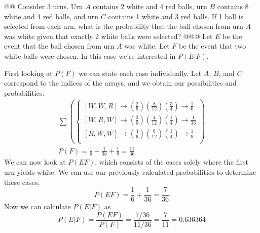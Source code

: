 \documentclass[10pt]{article}
\begin{document}
\begin{easylist}[enumerate]
    @@ Consider 3 urns. Urn $A$ contains 2 white and 4 red balls, urn $B$ contains 8 white and 4 red balls, and urn $C$
    contains 1 white and 3 red balls. If 1 ball is selected from each urn, what is the probability that the ball chosen
    from urn $A$ was white given that exactly 2 white balls were selected?
    @@@ Let $E$ be the event that the ball chosen from urn $A$ was white. Let $F$ be the event that two white balls were
    chosen. In this case we're interested in $P(E|F)$.\newline

    First looking at $P(F)$ we can state each case individually. Let $A$, $B$, and $C$ correspond to the indices of the
    arrays, and we obtain our possibilities and probabilities.
        \[ \begin{aligned}
            \sum \left(
            \begin{cases}
                [ W, W, R ] \to \left( \frac{2}{6} \right)\left( \frac{8}{12} \right)\left( \frac{3}{4} \right) \to \frac{1}{6}\\
                [ W, R, W ] \to \left( \frac{2}{6} \right)\left( \frac{4}{12} \right)\left( \frac{1}{4} \right) \to \frac{1}{36}\\
                [ R, W, W ] \to \left( \frac{4}{6} \right)\left( \frac{8}{12} \right)\left( \frac{1}{4} \right) \to \frac{1}{9}\\
            \end{cases}\right)\\
            P(F) = \frac{1}{6} + \frac{1}{36} + \frac{1}{9} = \frac{11}{36}
        \end{aligned} \]
    We can now look at $P(EF)$, which consists of the cases solely where the first urn yields white. We can use our
    previously calculated probabilities to determine these cases.
        \[ P(EF) = \frac{1}{6} + \frac{1}{36} = \frac{7}{36} \]
    Now we can calculate $P(E|F)$ as
        \[ P(E|F) = \frac{P(EF)}{P(F)} = \frac{7/36}{11/36} = \frac{7}{11} = \boxed{0.636364} \]


\end{easylist}
\end{document}
